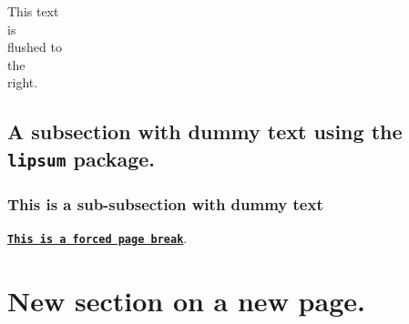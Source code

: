 \documentclass{article}
\begin{document}
\begin{flushright}
This text\\is\\flushed to\\the\\right.
\end{flushright}

\subsection{A subsection with dummy text using the \texttt{lipsum} package.}
\lipsum[1] %
\subsubsection{This is a sub-subsection with dummy text}
\lipsum[2] %


{\large \underline{\textbf{\texttt{This is a forced page break}}}}.
\pagebreak

\section{New section on a new page.}
\lipsum[3-4]  %
\end{document}
